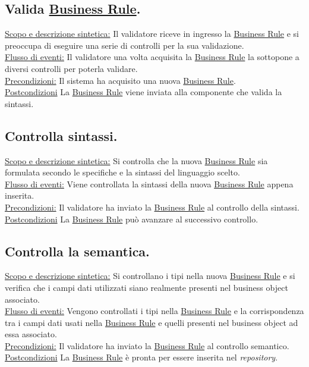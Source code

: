 \subsection{Valida \underline{Business Rule}.}
\underline{Scopo e descrizione sintetica:} Il validatore riceve in ingresso la \underline{Business Rule} e si preoccupa di eseguire una serie di controlli per la sua validazione.\\
\underline{Flusso di eventi:} Il validatore una volta acquisita la \underline{Business Rule} la sottopone a diversi controlli per poterla validare.\\
\underline{Precondizioni:} Il sistema ha acquisito una nuova \underline{Business Rule}.\\
\underline{Postcondizioni} La \underline{Business Rule} viene inviata alla componente che valida la sintassi.
 
\subsection{Controlla sintassi.}
\underline{Scopo e descrizione sintetica:} Si controlla che la nuova \underline{Business Rule} sia formulata secondo le specifiche e la sintassi del linguaggio scelto.\\
\underline{Flusso di eventi:} Viene controllata la sintassi della nuova \underline{Business Rule} appena inserita.\\
\underline{Precondizioni:} Il validatore ha inviato la \underline{Business Rule} al controllo della sintassi.\\
\underline{Postcondizioni} La \underline{Business Rule} pu\`o avanzare al successivo controllo.

\subsection{Controlla la semantica.}
\underline{Scopo e descrizione sintetica:} Si controllano i tipi nella nuova \underline{Business Rule} e si verifica che i campi dati utilizzati siano realmente presenti nel business object associato.\\
\underline{Flusso di eventi:} Vengono controllati i tipi nella \underline{Business Rule} e la corrispondenza tra i campi dati usati nella \underline{Business Rule} e quelli presenti nel business object ad essa associato.\\
\underline{Precondizioni:} Il validatore ha inviato la \underline{Business Rule} al controllo semantico.\\
\underline{Postcondizioni} La \underline{Business Rule} \`e pronta per essere inserita nel \textit{repository}.

